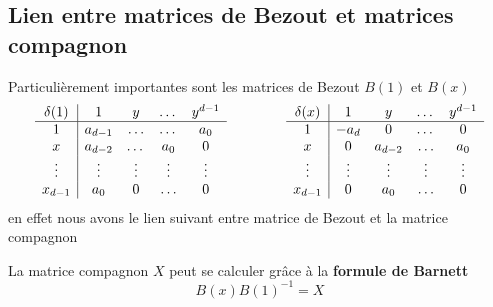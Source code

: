 \documentclass{standalone}
\begin{document}
\subsection{Lien entre matrices de Bezout et matrices compagnon}
\label{Bar}
Particulièrement importantes sont les matrices de Bezout $B(1)$ et $B(x)$
\begin{equation}
	\begin{array}{c|cccc}
		\delta(1) & 1 & y & \dots & y^{d-1} \\
		\hline
		1 & a_{d-1} & \ldots & \dots & a_0 \\
		x & a_{d-2} & \dots & a_0 & 0 \\
		\vdots & \vdots & \vdots & \vdots & \vdots \\
		x_{d-1} & a_0 & 0 & \ldots & 0 \\
	\end{array}
	\hspace{1.5cm}
	\begin{array}{c|cccc}
		\delta(x) & 1 & y & \dots & y^{d-1} \\
		\hline
		1 & -a_{d} & 0 & \dots & 0 \\
		x & 0 & a_{d-2} & \ldots & a_0 \\
		\vdots & \vdots & \vdots & \vdots & \vdots \\
		x_{d-1} & 0 & a_0 & \ldots & 0 \\
	\end{array}
\end{equation}
en effet nous avons le lien suivant entre matrice de Bezout et la matrice compagnon
\begin{prop}
\label{Barnett}
La matrice compagnon $X$ peut se calculer grâce à la {\bf formule de Barnett}
\cite{Barnett}
\begin{equation}
	B(x)B(1)^{-1} = X
\end{equation}
\end{prop}
\end{document}
